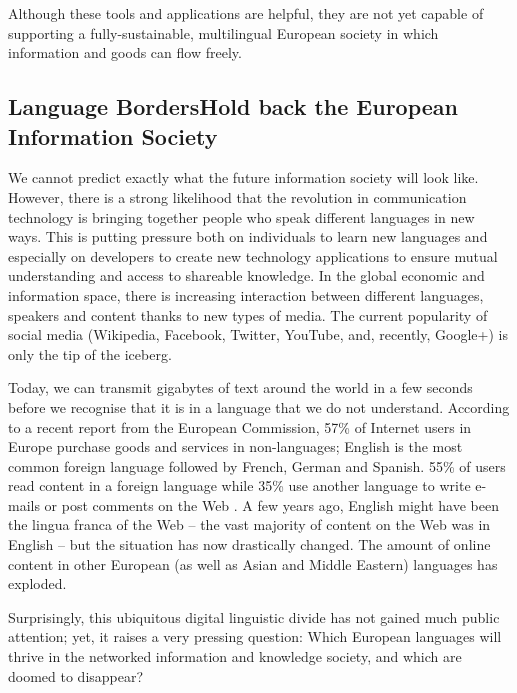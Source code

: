 \begin{multicols}{2}
Although these tools and applications are helpful, they are not yet capable of supporting a fully-sustainable, multilingual European society in which information and goods can flow freely.

\subsection[Language Borders Hold back the European Information Society]{Language Borders\newline Hold back the European Information Society}

We cannot predict exactly what the future information society will look like. However, there is a strong likelihood that the revolution in communication technology is bringing together people who speak different languages in new ways. This is putting pressure both on individuals to learn new languages and especially on developers to create new technology applications to ensure mutual understanding and access to shareable knowledge. In the global economic and information space, there is increasing interaction between different languages, speakers and content thanks to new types of media. The current popularity of social media (Wikipedia, Facebook, Twitter, YouTube, and, recently, Google+) is only the tip of the iceberg.


Today, we can transmit gigabytes of text around the world in a few seconds before we recognise that it is in a language that we do not understand. According to a recent report from the European Commission, 57\% of Internet users in Europe purchase goods and services in non-languages; English is the most common foreign language followed by French, German and Spanish. 55\% of users read content in a foreign language while 35\% use another language to write e-mails or post comments on the Web \cite{EC1}. A few years ago, English might have been the lingua franca of the Web -- the vast majority of content on the Web was in English -- but the situation has now drastically changed. The amount of online content in other European (as well as Asian and Middle Eastern) languages has exploded.

Surprisingly, this ubiquitous digital linguistic divide has not gained much public attention; yet, it raises a very pressing question: Which European languages will thrive in the networked information and knowledge society, and which are doomed to disappear?


\end{multicols}
